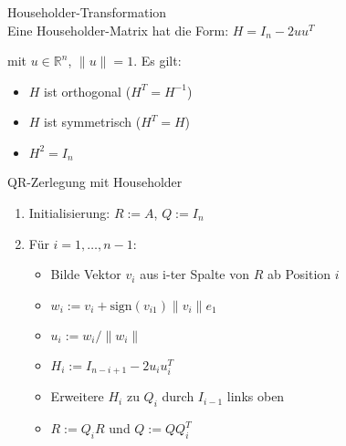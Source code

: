 \begin{definition}{Householder-Transformation}\\
Eine Householder-Matrix hat die Form:
$H = I_n - 2uu^T$

mit $u \in \mathbb{R}^n$, $\|u\| = 1$. Es gilt:
\begin{itemize}
    \item $H$ ist orthogonal ($H^T = H^{-1}$)
    \item $H$ ist symmetrisch ($H^T = H$)
    \item $H^2 = I_n$
\end{itemize}
\end{definition}

\begin{KR}{QR-Zerlegung mit Householder}
\begin{enumerate}
    \item Initialisierung: $R := A$, $Q := I_n$
    \item Für $i = 1,\ldots,n-1$:
        \begin{itemize}
            \item Bilde Vektor $v_i$ aus i-ter Spalte von $R$ ab Position $i$
            \item $w_i := v_i + \text{sign}(v_{i1})\|v_i\|e_1$
            \item $u_i := w_i/\|w_i\|$
            \item $H_i := I_{n-i+1} - 2u_iu_i^T$
            \item Erweitere $H_i$ zu $Q_i$ durch $I_{i-1}$ links oben
            \item $R := Q_iR$ und $Q := QQ_i^T$
        \end{itemize}
\end{enumerate}
\end{KR}

